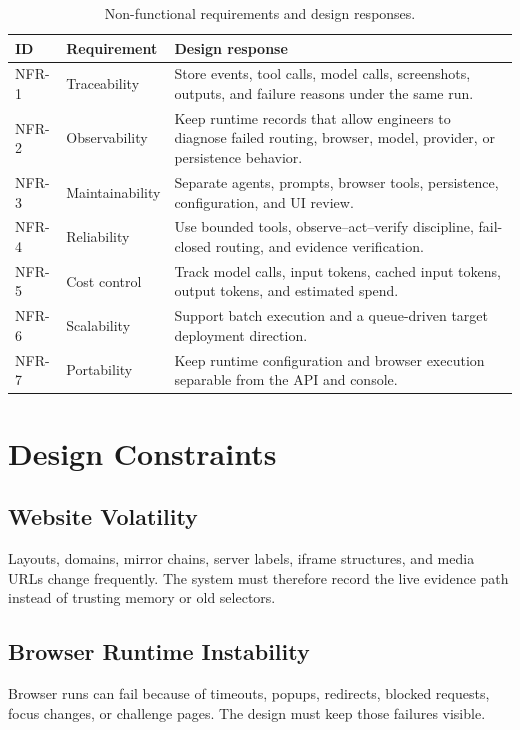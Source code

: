\begin{table}[!htbp]
\centering
\begin{tabularx}{\textwidth}{Q{1.35cm} Y Y}
\toprule
{}
ID & Requirement & Design response \\
\midrule
NFR-1 & Traceability & Store events, tool calls, model calls, screenshots,
outputs, and failure reasons under the same run. \\
NFR-2 & Observability & Keep runtime records that allow engineers to diagnose
failed routing, browser, model, provider, or persistence behavior. \\
NFR-3 & Maintainability & Separate agents, prompts, browser tools,
persistence, configuration, and UI review. \\
NFR-4 & Reliability & Use bounded tools, observe--act--verify discipline,
fail-closed routing, and evidence verification. \\
NFR-5 & Cost control & Track model calls, input tokens, cached input tokens,
output tokens, and estimated spend. \\
NFR-6 & Scalability & Support batch execution and a queue-driven target
deployment direction. \\
NFR-7 & Portability & Keep runtime configuration and browser execution
separable from the API and console. \\
\bottomrule
\end{tabularx}
\caption{Non-functional requirements and design responses.}
\label{tab:nfr-summary}
\end{table}

\section{Design Constraints}

\subsection{Website Volatility}

Layouts, domains, mirror chains, server labels, iframe structures, and media
URLs change frequently. The system must therefore record the live evidence path
instead of trusting memory or old selectors.

\subsection{Browser Runtime Instability}

Browser runs can fail because of timeouts, popups, redirects, blocked
requests, focus changes, or challenge pages. The design must keep those
failures visible.

